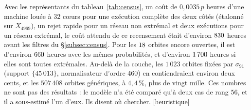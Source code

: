 \documentclass[11pt,a4paper]{amsart}
\theoremstyle{plain}
\theoremstyle{definition}
\newcommand{\st}[1]{\textup{\textsf{\small[#1]}}}
\newcommand{\HEUR}{\st{heuristique}}
\begin{document}
Avec les représentants du tableau~\ref{tab:census}, un coût de $0{,}0035\,p$ heures d'une machine louée à $32$ cœurs pour une exécution complète des deux côtés (étalonné sur $X_{4969}$), un rejet rapide pour un réseau non extrémal et deux exécutions pour un réseau extrémal, le coût attendu de ce recensement était d'environ $830$ heures avant les filtres du \S\ref{subsec:census}. Pour les $18$ orbites encore ouvertes, il est d'environ $660$ heures avec les mêmes probabilités, et d'environ $1\,700$ heures si elles sont toutes extrémales. Au-delà de la couche, les $1\,023$ orbites fixées par $\sigma_{91}$ (support $\{45\,013\}$, normalisateur d'ordre $460$) en contiendraient environ deux cents, et les $507\,408$ orbites génériques, à $4{,}4\,\%$, plus de vingt mille. Ces nombres ne sont pas des résultats : le modèle n'a été comparé qu'à deux cas de rang $56$, et il a sous-estimé l'un d'eux. Ils disent où chercher. \HEUR
\end{document}
